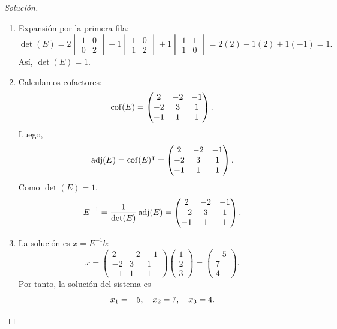 \documentclass[a4,11pt]{aleph-notas}
\begin{document}
\begin{proof}[Solución]\hspace{0pt}
    \begin{enumerate}
    \item
        Expansión por la primera fila:
        \[
            \det(E)=2\begin{vmatrix}1 & 0 \\ 0 & 2\end{vmatrix}-1\begin{vmatrix}1 & 0 \\ 1 & 2\end{vmatrix}+1\begin{vmatrix}1 & 1 \\ 1 & 0\end{vmatrix}=2(2)-1(2)+1(-1)=1.
        \]
        Así, $\det(E)=1$.
    \item
        Calculamos cofactores:
        \[
            \operatorname{cof}(E)=
            \begin{pmatrix}
                2 & -2 & -1 \\
                -2 & 3 & 1 \\
                -1 & 1 & 1
            \end{pmatrix}.
        \]
        Luego,
        \[
            \operatorname{adj}(E)=\operatorname{cof}(E)^\intercal=
            \begin{pmatrix}
                2 & -2 & -1 \\
                -2 & 3 & 1 \\
                -1 & 1 & 1
            \end{pmatrix}.
        \]
        Como $\det(E)=1$,
        \[
            E^{-1}=\frac{1}{\det(E)}\operatorname{adj}(E)=
            \begin{pmatrix}
                2 & -2 & -1 \\
                -2 & 3 & 1 \\
                -1 & 1 & 1
            \end{pmatrix}.
        \]
    \item
        La solución es $x=E^{-1}b$:
        \[
            x=
            \begin{pmatrix}
                2 & -2 & -1 \\
                -2 & 3 & 1 \\
                -1 & 1 & 1
            \end{pmatrix}
            \begin{pmatrix}
                1 \\
                2 \\
                3
            \end{pmatrix}
            =
            \begin{pmatrix}
                -5 \\
                7 \\
                4
            \end{pmatrix}.
        \]
        Por tanto, la solución del sistema es
        \[
            x_1=-5,\quad x_2=7,\quad x_3=4.\qedhere
        \]
    \end{enumerate}
\end{proof}
\end{document}
